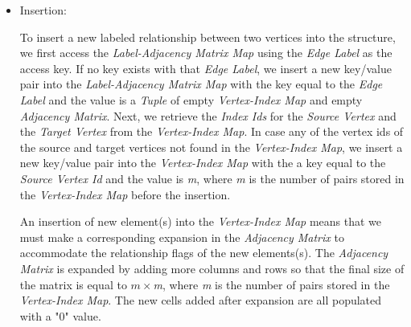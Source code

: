 {\begin{itemize}
Each cell in the two dimensional matrix stores a boolean flag that indicates the existence of a relationship (i.e. flag = 1) between a source vertex which is associated with the row index of the cell, and a target vertex which is associated with the column index of the cell. A cell with "0" value means no relationship exists between the two vertices associated with the row and column index respectively.


In (\ref{fig_adjacencyMatrix_physical}), the \textit{Label-Adjacency Matrix Map} is a key/value store we use to associate every \textit{Edge Label} with a \textit{Tuple} that groups the \textit{Adjacency Matrix} and the \textit{Vertex-Index Map} in one container. Each \textit{Adjacency Matrix} will store the edge between the \textit{Source Vertex} and \textit{Target Vertex} which is labeled with the \textit{Edge Label} it's associated with.

\item{Insertion:}

To insert a new labeled relationship between two vertices into the structure, we first access the \textit{Label-Adjacency Matrix Map} using the \textit{Edge Label} as the access key. If no key exists with that \textit{Edge Label}, we insert a new key/value pair into the \textit{Label-Adjacency Matrix Map} with the key equal to the \textit{Edge Label} and the value is a \textit{Tuple} of empty \textit{Vertex-Index Map} and empty \textit{Adjacency Matrix}. Next, we retrieve the \textit{Index Ids} for the \textit{Source Vertex} and the \textit{Target Vertex} from the \textit{Vertex-Index Map}. In case any of the vertex ids of the source and target vertices not found in the \textit{Vertex-Index Map}, we insert a new key/value pair into the \textit{Vertex-Index Map} with the a key equal to the \textit{Source Vertex Id} and the value is \textit{m}, where \textit{m} is the number of pairs stored in the \textit{Vertex-Index Map} before the insertion. 

An insertion of new element(s) into the \textit{Vertex-Index Map} means that we must make a corresponding expansion in the \textit{Adjacency Matrix} to accommodate the relationship flags of the new elements(s). The \textit{Adjacency Matrix} is expanded by adding more columns and rows so that the final size of the matrix is equal to \textit{$m \times $m}, where \textit{m} is the number of pairs stored in the \textit{Vertex-Index Map}. The new cells added after expansion are all populated with a "0" value. 


\end{itemize}}
